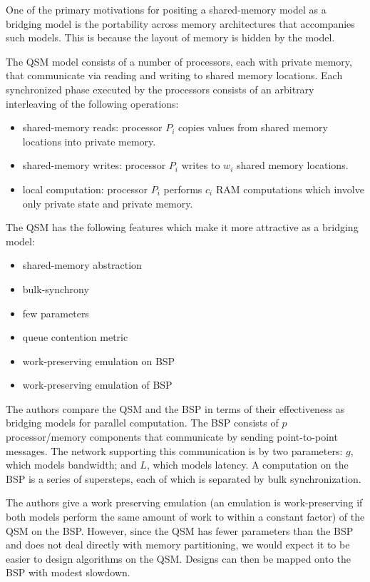 \documentclass[12pt,a4paper]{article}
\begin{document}
One of the primary motivations for positing a shared-memory model as a bridging model is the portability across memory architectures that accompanies such
models. This is because the layout of memory is hidden by the model.

The QSM model consists of a number of processors, each with private memory, that communicate via reading and writing to shared memory locations. Each
synchronized phase executed by the processors consists of an arbitrary interleaving of the following operations:

\begin{itemize}
\item shared-memory reads: processor $P_i$ copies values from shared memory locations into private memory. 
\item shared-memory writes: processor $P_i$ writes to $w_i$ shared memory locations.
\item local computation: processor $P_i$ performs $c_i$ RAM computations which involve only private state and private memory.
\end{itemize}

The QSM has the following features which make it more attractive as a bridging model:

\begin{itemize}
\item shared-memory abstraction
\item bulk-synchrony
\item few parameters
\item queue contention metric
\item work-preserving emulation on BSP
\item work-preserving emulation of BSP
\end{itemize}

The authors compare the QSM and the BSP in terms of their effectiveness as bridging models for parallel computation. The BSP consists of $p$ processor/memory
components that communicate by sending point-to-point messages. The network supporting this communication is by two parameters: $g$, which models bandwidth;
and $L$, which models latency. A computation on the BSP is a series of supersteps, each of which is separated by bulk synchronization.

The authors give a work preserving emulation (an emulation is work-preserving if both models perform the same amount of work to within a constant factor) of
the QSM on the BSP. However, since the QSM has fewer parameters than the BSP and does not deal directly with memory partitioning, we would expect it to be
easier to design algorithms on the QSM. Designs can then be mapped onto the BSP with modest slowdown. 
\end{document}
